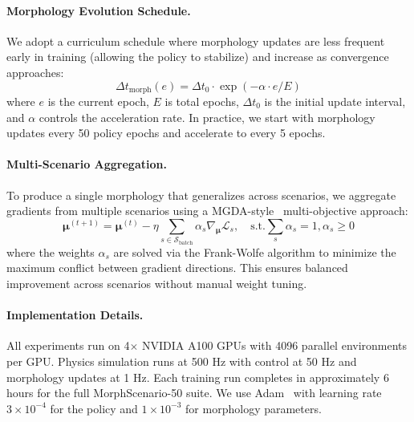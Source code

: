 \paragraph{Morphology Evolution Schedule.}
We adopt a curriculum schedule where morphology updates are less frequent early in training (allowing the policy to stabilize) and increase as convergence approaches:
\begin{equation}
    \Delta t_\text{morph}(e) = \Delta t_0 \cdot \exp(-\alpha \cdot e / E)
\end{equation}
where $e$ is the current epoch, $E$ is total epochs, $\Delta t_0$ is the initial update interval, and $\alpha$ controls the acceleration rate. In practice, we start with morphology updates every 50 policy epochs and accelerate to every 5 epochs.

\paragraph{Multi-Scenario Aggregation.}
To produce a single morphology that generalizes across scenarios, we aggregate gradients from multiple scenarios using a MGDA-style~\citep{desideri2012mgda} multi-objective approach:
\begin{equation}
    \boldsymbol{\mu}^{(t+1)} = \boldsymbol{\mu}^{(t)} - \eta \sum_{s \in \mathcal{S}_\text{batch}} \alpha_s \nabla_{\boldsymbol{\mu}} \mathcal{L}_s, \quad \text{s.t.} \sum_s \alpha_s = 1, \alpha_s \geq 0
\end{equation}
where the weights $\alpha_s$ are solved via the Frank-Wolfe algorithm to minimize the maximum conflict between gradient directions. This ensures balanced improvement across scenarios without manual weight tuning.

\paragraph{Implementation Details.}
All experiments run on 4$\times$ NVIDIA A100 GPUs with 4096 parallel environments per GPU. Physics simulation runs at 500 Hz with control at 50 Hz and morphology updates at 1 Hz. Each training run completes in approximately 6 hours for the full MorphScenario-50 suite. We use Adam~\citep{kingma2015adam} with learning rate $3 \times 10^{-4}$ for the policy and $1 \times 10^{-3}$ for morphology parameters.

